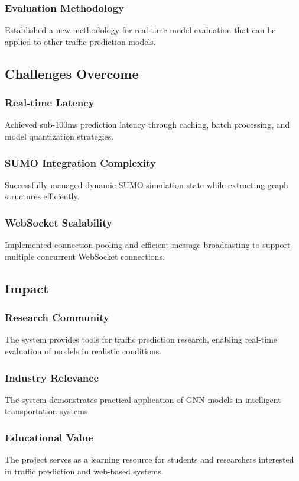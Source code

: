 \subsubsection{Evaluation Methodology}
Established a new methodology for real-time model evaluation that can be applied to other traffic prediction models.

\subsection{Challenges Overcome}

\subsubsection{Real-time Latency}
Achieved sub-100ms prediction latency through caching, batch processing, and model quantization strategies.

\subsubsection{SUMO Integration Complexity}
Successfully managed dynamic SUMO simulation state while extracting graph structures efficiently.

\subsubsection{WebSocket Scalability}
Implemented connection pooling and efficient message broadcasting to support multiple concurrent WebSocket connections.

\subsection{Impact}

\subsubsection{Research Community}
The system provides tools for traffic prediction research, enabling real-time evaluation of models in realistic conditions.

\subsubsection{Industry Relevance}
The system demonstrates practical application of GNN models in intelligent transportation systems.

\subsubsection{Educational Value}
The project serves as a learning resource for students and researchers interested in traffic prediction and web-based systems.


